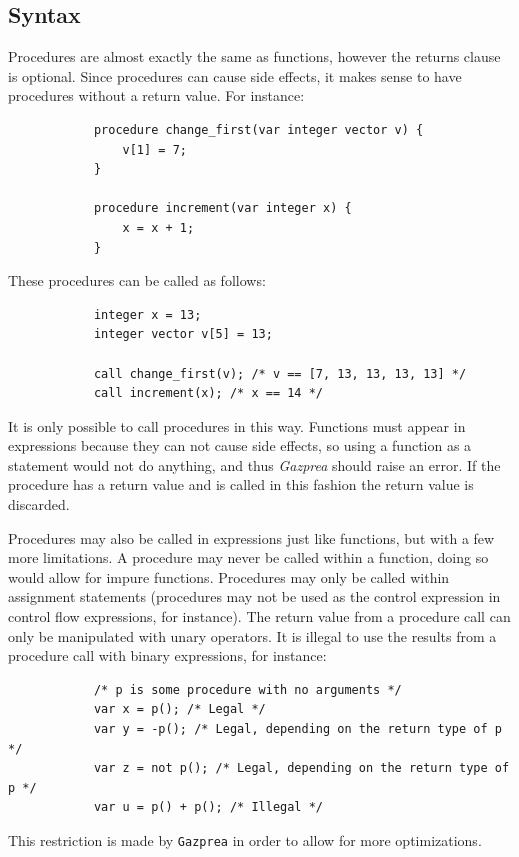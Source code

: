 \documentclass{article}
\begin{document}
	\subsection{Syntax}

		Procedures are almost exactly the same as functions, however the returns clause is optional. Since procedures
		can cause side effects, it makes sense to have procedures without a return value. For instance:

		\begin{lstlisting}
			procedure change_first(var integer vector v) {
				v[1] = 7;
			}

			procedure increment(var integer x) {
				x = x + 1;
			}
		\end{lstlisting}

		These procedures can be called as follows:

		\begin{lstlisting}
			integer x = 13;
			integer vector v[5] = 13;

			call change_first(v); /* v == [7, 13, 13, 13, 13] */
			call increment(x); /* x == 14 */
		\end{lstlisting}

		It is only possible to call procedures in this way. Functions must appear in expressions because they can not
		cause side effects, so using a function as a statement would not do anything, and thus \textit{Gazprea} should
		raise an error. If the procedure has a return value and is called in this fashion the return value is discarded.

		Procedures may also be called in expressions just like functions, but with a few more limitations. A procedure
		may never be called within a function, doing so would allow for impure functions. Procedures may only be called
		within assignment statements (procedures may not be used as the control expression in control flow expressions,
		for instance). The return value from a procedure call can only be manipulated with unary operators. It is
		illegal to use the results from a procedure call with binary expressions, for instance:

		\begin{lstlisting}
			/* p is some procedure with no arguments */
			var x = p(); /* Legal */
			var y = -p(); /* Legal, depending on the return type of p */
			var z = not p(); /* Legal, depending on the return type of p */
			var u = p() + p(); /* Illegal */
		\end{lstlisting}

		This restriction is made by \texttt{Gazprea} in order to allow for more optimizations.
\end{document}
